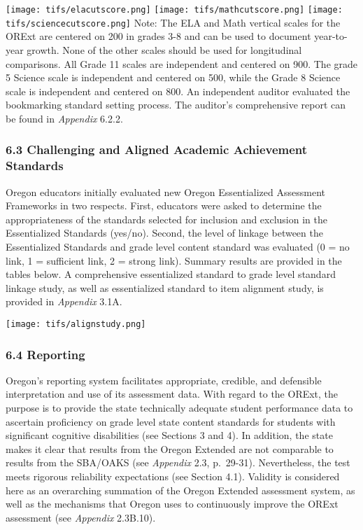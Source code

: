 \documentclass[]{article}
\begin{document}
\FloatBarrier

\texttt{[image: tifs/elacutscore.png]}
\texttt{[image: tifs/mathcutscore.png]}
\texttt{[image: tifs/sciencecutscore.png]} Note: The ELA and Math
vertical scales for the ORExt are centered on 200 in grades 3-8 and can
be used to document year-to-year growth. None of the other scales should
be used for longitudinal comparisons. All Grade 11 scales are
independent and centered on 900. The grade 5 Science scale is
independent and centered on 500, while the Grade 8 Science scale is
independent and centered on 800. An independent auditor evaluated the
bookmarking standard setting process. The auditor's comprehensive report
can be found in \emph{Appendix} 6.2.2.

\hypertarget{challenging-and-aligned-academic-achievement-standards}{%
\subsubsection{6.3 Challenging and Aligned Academic Achievement
Standards}\label{challenging-and-aligned-academic-achievement-standards}}

Oregon educators initially evaluated new Oregon Essentialized Assessment
Frameworks in two respects. First, educators were asked to determine the
appropriateness of the standards selected for inclusion and exclusion in
the Essentialized Standards (yes/no). Second, the level of linkage
between the Essentialized Standards and grade level content standard was
evaluated (0 = no link, 1 = sufficient link, 2 = strong link). Summary
results are provided in the tables below. A comprehensive essentialized
standard to grade level standard linkage study, as well as essentialized
standard to item alignment study, is provided in \emph{Appendix} 3.1A.

\FloatBarrier

\texttt{[image: tifs/alignstudy.png]}

\hypertarget{reporting}{%
\subsubsection{6.4 Reporting}\label{reporting}}

Oregon's reporting system facilitates appropriate, credible, and
defensible interpretation and use of its assessment data. With regard to
the ORExt, the purpose is to provide the state technically adequate
student performance data to ascertain proficiency on grade level state
content standards for students with significant cognitive disabilities
(see Sections 3 and 4). In addition, the state makes it clear that
results from the Oregon Extended are not comparable to results from the
SBA/OAKS (see \emph{Appendix} 2.3, p.~29-31). Nevertheless, the test
meets rigorous reliability expectations (see Section 4.1). Validity is
considered here as an overarching summation of the Oregon Extended
assessment system, as well as the mechanisms that Oregon uses to
continuously improve the ORExt assessment (see \emph{Appendix} 2.3B.10).
\end{document}
